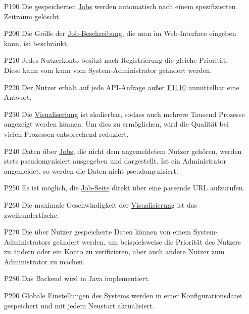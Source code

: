 \begin{itemize}[noitemsep]
    \item[P190] Die gespeicherten \hyperref[B:Jobs]{Jobs} werden automatisch nach einem spezifizierten Zeitraum gelöscht.

    \item[P200] Die Größe der \hyperref[B:Job-Beschreibung]{Job-Beschreibung}, die man im Web-Interface eingeben kann, ist beschränkt.

    
    \item[P210] Jedes \gls{Nutzerkonto} besitzt nach Registrierung die gleiche Priorität. Diese kann vom kann vom \gls{System-Administrator} geändert werden.
    
    
    \item[P220] Der \gls{Nutzer} erhält auf jede \gls{API}-Anfrage außer \hyperref[FA:API:Andauernde Abfrage des Ergebnisses eines Jobs]{F1110} unmittelbar eine  Antwort.
    
    \item[P230] Die \hyperref[pages:visualization]{Visualiseriung} ist skalierbar, sodass auch mehrere Tausend Prozesse angezeigt werden können. Um dies zu ermöglichen, wird die Qualität bei vielen Prozessen entsprechend reduziert.%
    
    \item[P240] Daten über \hyperref[B:Jobs]{Jobs}, die nicht dem angemeldetem \gls{Nutzer} gehören, werden stets pseudomynisiert ausgegeben und dargestellt. Ist ein \gls{Administrator}  angemeldet, so werden die Daten nicht pseudomynisiert.
    
    \item[P250] Es ist möglich, die \hyperref[pages:job-page]{Job-Seite} direkt über eine passende \gls{URL} aufzurufen.
    
    \item[P260] Die maximale Geschwindigkeit der \hyperref[pages:visualization]{Visualisierung} ist das zweihundertfache.
    
    \item[P270] Die über Nutzer gespeicherte Daten können von einem \glspl{System-Administrator} geändert werden, um beispielsweise die Priorität des Nutzers zu ändern oder ein Konto zu verifizieren, aber auch andere Nutzer zum \gls{Administrator} zu machen.
    
    \item[P280] Das Backend wird in Java implementiert.

    \item[P290] Globale Einstellungen des Systems werden in einer \gls{Konfigurationsdatei} gespeichert und mit jedem Neustart aktualisiert.

\end{itemize}